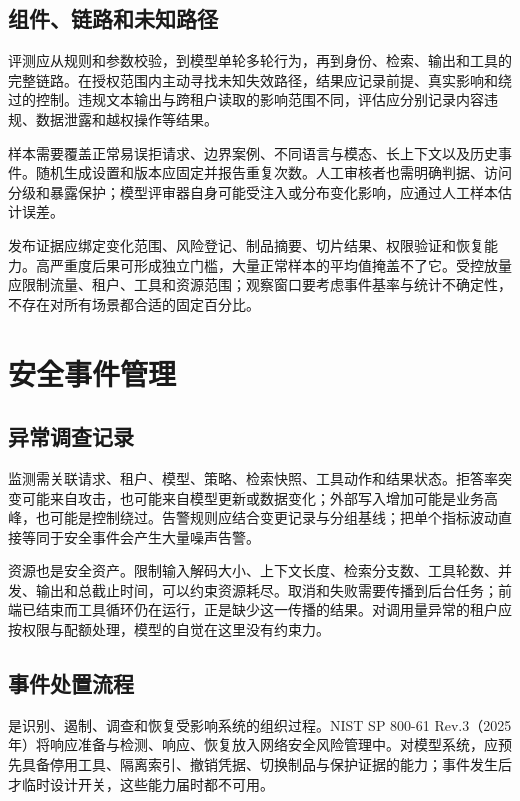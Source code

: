 \documentclass[../textbook.tex]{subfiles}
\begin{document}
\subsection{组件、链路和未知路径}
评测应从规则和参数校验，到模型单轮多轮行为，再到身份、检索、输出和工具的完整链路。在授权范围内主动寻找未知失效路径，结果应记录前提、真实影响和绕过的控制。违规文本输出与跨租户读取的影响范围不同，评估应分别记录内容违规、数据泄露和越权操作等结果。

样本需要覆盖正常易误拒请求、边界案例、不同语言与模态、长上下文以及历史事件。随机生成设置和版本应固定并报告重复次数。人工审核者也需明确判据、访问分级和暴露保护；模型评审器自身可能受注入或分布变化影响，应通过人工样本估计误差。

发布证据应绑定变化范围、风险登记、制品摘要、切片结果、权限验证和恢复能力。高严重度后果可形成独立门槛，大量正常样本的平均值掩盖不了它。受控放量应限制流量、租户、工具和资源范围；观察窗口要考虑事件基率与统计不确定性，不存在对所有场景都合适的固定百分比。

\section{安全事件管理}

\subsection{异常调查记录}
监测需关联请求、租户、模型、策略、检索快照、工具动作和结果状态。拒答率突变可能来自攻击，也可能来自模型更新或数据变化；外部写入增加可能是业务高峰，也可能是控制绕过。告警规则应结合变更记录与分组基线；把单个指标波动直接等同于安全事件会产生大量噪声告警。

资源也是安全资产。限制输入解码大小、上下文长度、检索分支数、工具轮数、并发、输出和总截止时间，可以约束资源耗尽。取消和失败需要传播到后台任务；前端已结束而工具循环仍在运行，正是缺少这一传播的结果。对调用量异常的租户应按权限与配额处理，模型的自觉在这里没有约束力。

\subsection{事件处置流程}
是识别、遏制、调查和恢复受影响系统的组织过程。NIST SP 800-61 Rev.3（2025年）将响应准备与检测、响应、恢复放入网络安全风险管理中\cite{nist2025incidentresponse}。对模型系统，应预先具备停用工具、隔离索引、撤销凭据、切换制品与保护证据的能力；事件发生后才临时设计开关，这些能力届时都不可用。
\end{document}
